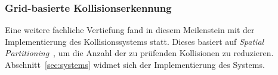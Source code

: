 \subsubsection{Grid-basierte Kollisionserkennung}

Eine weitere fachliche Vertiefung fand in diesem Meilenstein mit der Implementierung des Kollisionssystems statt.
Dieses basiert auf \textit{Spatial Partitioning}~\cite[S. 18]{Eri04}, um die Anzahl der zu prüfenden Kollisionen zu reduzieren.
Abschnitt~\ref{sec:systems} widmet sich der Implementierung des Systems.